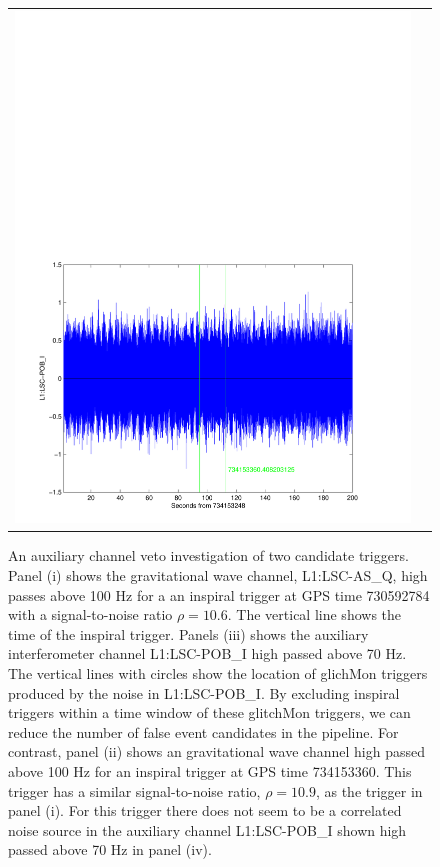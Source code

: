 \begin{figure}[p]
\begin{center}
\begin{tabular}{cc}
\includegraphics[width=0.475\linewidth]{figures/pipeline/trigger_734153360_pob_i}\\
\end{tabular}
\end{center}
\caption{\label{f:vetoes}%
An auxiliary channel veto investigation of two candidate triggers. Panel (i)
shows the gravitational wave channel, L1:LSC-AS\_Q, high passes above 100 Hz
for a an inspiral trigger at GPS time 730592784 with a signal-to-noise ratio
$\rho = 10.6$. The vertical line shows the time of the inspiral trigger.
Panels (iii) shows the auxiliary interferometer channel L1:LSC-POB\_I high
passed above 70 Hz. The vertical lines with circles show the location of
glichMon triggers produced by the noise in L1:LSC-POB\_I. By excluding
inspiral triggers within a time window of these glitchMon triggers, we can
reduce the number of false event candidates in the pipeline. For contrast,
panel (ii) shows an gravitational wave channel high passed above 100 Hz for
an inspiral trigger at GPS time 734153360. This trigger has a similar
signal-to-noise ratio, $\rho = 10.9$, as the trigger in panel (i). For this
trigger there does not seem to be a correlated noise source in the auxiliary
channel L1:LSC-POB\_I shown high passed above 70 Hz in panel (iv).  
}
\end{figure}


